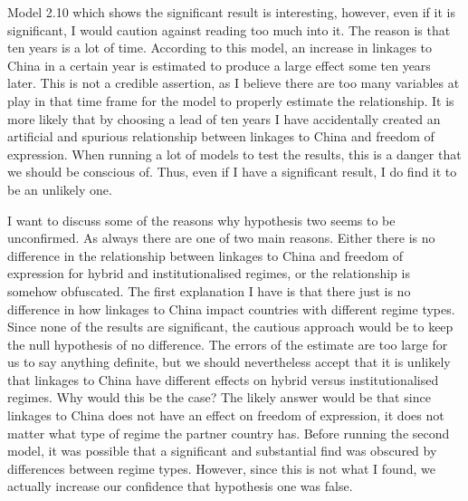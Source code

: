 Model 2.10 which shows the significant result is interesting, however, even if it is significant, I would caution against reading too much into it. The reason is that ten years is a lot of time. According to this model, an increase in linkages to China in a certain year is estimated to produce a large effect some ten years later. This is not a credible assertion, as I believe there are too many variables at play in that time frame for the model to properly estimate the relationship. It is more likely that by choosing a lead of ten years I have accidentally created an artificial and spurious relationship between linkages to China and freedom of expression. When running a lot of models to test the results, this is a danger that we should be conscious of. Thus, even if I have a significant result, I do find it to be an unlikely one. 

I want to discuss some of the reasons why hypothesis two seems to be unconfirmed. As always there are one of two main reasons.  Either there is no difference in the relationship between linkages to China and freedom of expression for hybrid  and institutionalised regimes, or the relationship is somehow obfuscated. The first explanation I have is that there just is no difference in how linkages to China impact countries with different regime types. Since none of the results are significant, the cautious approach would be to keep the null hypothesis of no difference. The errors of the estimate are too large for us to say anything definite, but we should nevertheless accept that it is unlikely that linkages to China have different effects on hybrid versus institutionalised regimes. Why would this be the case? The likely answer would be that since linkages to China does not have an effect on freedom of expression, it does not matter what type of regime the partner country has. Before running the second model, it was possible that a significant and substantial find was obscured by differences between regime types. However, since this is not what I found, we actually increase our confidence that hypothesis one was false.

